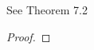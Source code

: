 \documentclass[../../main.tex]{subfiles}
\begin{document}
\begin{wts}
    See Theorem 7.2
\end{wts}
\begin{proof}

\end{proof}
\end{document}
